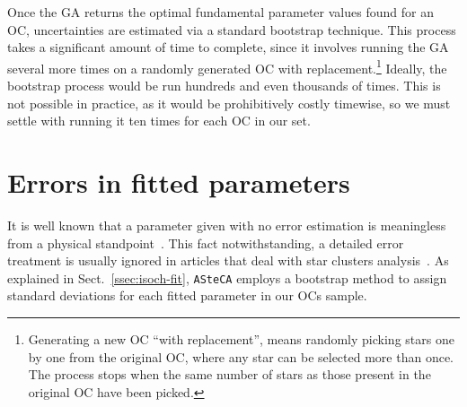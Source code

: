 \documentclass{aa}
\begin{document}
Once the GA returns the optimal fundamental parameter values found for an OC,
uncertainties are estimated via a standard bootstrap technique. This process
takes a significant amount of time to complete, since it involves running the GA
several more times on a randomly generated OC with replacement.\footnote
{Generating a new OC ``with replacement'', means randomly picking stars one by
one from the original OC, where any star can be selected more than once. The
process stops when the same number of stars as those present in the original OC
have been picked.} Ideally, the bootstrap process would be run hundreds and even
thousands of times. This is not possible in practice, as it would be
prohibitively costly timewise, so we must settle with running it ten times for
each OC in our set.





\section{Errors in fitted parameters}
\label{sec:errors-fit}

It is well known that a parameter given with no error estimation is
meaningless from a physical standpoint~\citep{Dolphin_2002,Andrae_2010}.
%
This fact notwithstanding, a detailed error treatment is usually ignored in
articles that deal with star clusters analysis~\citep{Paunzen_2006}.
As explained in Sect.~\ref{ssec:isoch-fit}, \texttt{ASteCA} employs a bootstrap
method to assign standard deviations for each fitted parameter in our OCs
sample.
\end{document}
